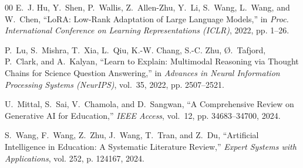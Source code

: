 \documentclass[conference]{IEEEtran}
\begin{document}
\begin{thebibliography}{00}
E.~J. Hu, Y.~Shen, P.~Wallis, Z.~Allen-Zhu, Y.~Li, S.~Wang, L.~Wang, and W.~Chen, ``LoRA: Low-Rank Adaptation of Large Language Models,'' in \emph{Proc. International Conference on Learning Representations (ICLR)}, 2022, pp. 1--26.

P.~Lu, S.~Mishra, T.~Xia, L.~Qiu, K.-W. Chang, S.-C. Zhu, \O.~Tafjord, P.~Clark, and A.~Kalyan, ``Learn to Explain: Multimodal Reasoning via Thought Chains for Science Question Answering,'' in \emph{Advances in Neural Information Processing Systems (NeurIPS)}, vol.~35, 2022, pp. 2507--2521.

U.~Mittal, S.~Sai, V.~Chamola, and D.~Sangwan, ``A Comprehensive Review on Generative AI for Education,'' \emph{IEEE Access}, vol.~12, pp. 34683--34700, 2024.

S.~Wang, F.~Wang, Z.~Zhu, J.~Wang, T.~Tran, and Z.~Du, ``Artificial Intelligence in Education: A Systematic Literature Review,'' \emph{Expert Systems with Applications}, vol. 252, p. 124167, 2024.

\end{thebibliography}
\end{document}
